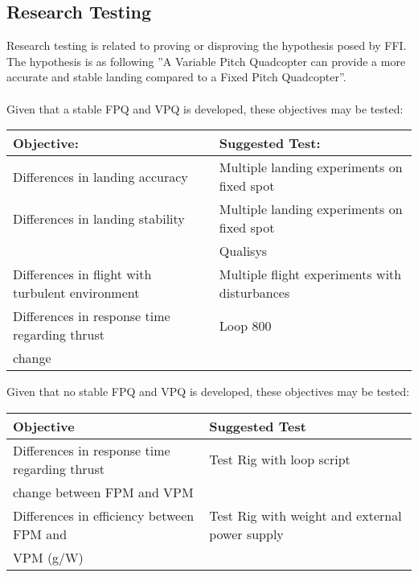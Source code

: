 \subsection{Research Testing}
Research testing is related to proving or disproving the hypothesis posed by FFI.
The hypothesis is as following ”A Variable Pitch Quadcopter can provide a more accurate and stable landing compared to a Fixed Pitch Quadcopter”. \\
\\
Given that a stable FPQ and VPQ is developed, these objectives may be tested:
\begin {table}[H]
    \begin{tabular}{|l|l|}\hline 
        \textbf{Objective:} & \textbf{Suggested Test:}\\
        \hline 
        Differences in landing accuracy & Multiple landing experiments on fixed spot\\ \hline
        Differences in landing stability & Multiple landing experiments on fixed spot\\
        &   Qualisys \\\hline
        Differences in flight with turbulent environment & Multiple flight experiments with disturbances\\ \hline
        Differences in response time regarding thrust & Loop 800 \\
        change & \\
        \hline 
    \end{tabular}
\end{table}
\noindent
Given that no stable FPQ and VPQ is developed, these objectives may be tested:
\begin {table}[H]
    \begin{tabular}{|l|l|}\hline 
        \textbf{Objective} & \textbf{Suggested Test}\\
        \hline 
        Differences in response time regarding thrust &  Test Rig with loop script\\
        change between FPM and VPM &      \\\hline
        Differences in efficiency between FPM and & Test Rig with weight and external power supply\\
        VPM (g/W) & \\
        \hline 
    \end{tabular}
\end{table}







